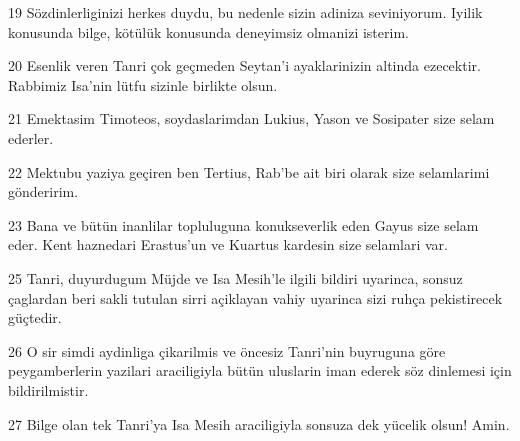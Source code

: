 \par 19 Sözdinlerliginizi herkes duydu, bu nedenle sizin adiniza seviniyorum. Iyilik konusunda bilge, kötülük konusunda deneyimsiz olmanizi isterim.
\par 20 Esenlik veren Tanri çok geçmeden Seytan'i ayaklarinizin altinda ezecektir. Rabbimiz Isa'nin lütfu sizinle birlikte olsun.
\par 21 Emektasim Timoteos, soydaslarimdan Lukius, Yason ve Sosipater size selam ederler.
\par 22 Mektubu yaziya geçiren ben Tertius, Rab'be ait biri olarak size selamlarimi gönderirim.
\par 23 Bana ve bütün inanlilar topluluguna konukseverlik eden Gayus size selam eder. Kent haznedari Erastus'un ve Kuartus kardesin size selamlari var.
\par 25 Tanri, duyurdugum Müjde ve Isa Mesih'le ilgili bildiri uyarinca, sonsuz çaglardan beri sakli tutulan sirri açiklayan vahiy uyarinca sizi ruhça pekistirecek güçtedir.
\par 26 O sir simdi aydinliga çikarilmis ve öncesiz Tanri'nin buyruguna göre peygamberlerin yazilari araciligiyla bütün uluslarin iman ederek söz dinlemesi için bildirilmistir.
\par 27 Bilge olan tek Tanri'ya Isa Mesih araciligiyla sonsuza dek yücelik olsun! Amin.


